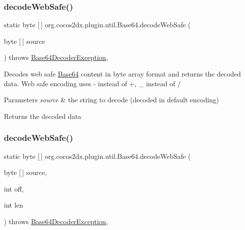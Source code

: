 \subsubsection{\texorpdfstring{decode\+Web\+Safe()}{decodeWebSafe()}\hspace{0.1cm}{\footnotesize\ttfamily [2/3]}}
{\footnotesize\ttfamily static byte \mbox{[}$\,$\mbox{]} org.\+cocos2dx.\+plugin.\+util.\+Base64.\+decode\+Web\+Safe (\begin{DoxyParamCaption}\item[{byte \mbox{[}$\,$\mbox{]}}]{source }\end{DoxyParamCaption}) throws \hyperlink{classorg_1_1cocos2dx_1_1plugin_1_1util_1_1Base64DecoderException}{Base64\+Decoder\+Exception}\hspace{0.3cm}{\ttfamily [inline]}, {\ttfamily [static]}}

Decodes web safe \hyperlink{classorg_1_1cocos2dx_1_1plugin_1_1util_1_1Base64}{Base64} content in byte array format and returns the decoded data. Web safe encoding uses \textquotesingle{}-\/\textquotesingle{} instead of \textquotesingle{}+\textquotesingle{}, \textquotesingle{}\+\_\+\textquotesingle{} instead of \textquotesingle{}/\textquotesingle{}


\begin{DoxyParams}{Parameters}
{\em source} & the string to decode (decoded in default encoding) \\
\hline
\end{DoxyParams}
\begin{DoxyReturn}{Returns}
the decoded data 
\end{DoxyReturn}
\mbox{\label{classorg_1_1cocos2dx_1_1plugin_1_1util_1_1Base64_a8de5b08172c34db233e20982ff553222}} 
\subsubsection{\texorpdfstring{decode\+Web\+Safe()}{decodeWebSafe()}\hspace{0.1cm}{\footnotesize\ttfamily [3/3]}}
{\footnotesize\ttfamily static byte \mbox{[}$\,$\mbox{]} org.\+cocos2dx.\+plugin.\+util.\+Base64.\+decode\+Web\+Safe (\begin{DoxyParamCaption}\item[{byte \mbox{[}$\,$\mbox{]}}]{source,  }\item[{int}]{off,  }\item[{int}]{len }\end{DoxyParamCaption}) throws \hyperlink{classorg_1_1cocos2dx_1_1plugin_1_1util_1_1Base64DecoderException}{Base64\+Decoder\+Exception}\hspace{0.3cm}{\ttfamily [inline]}, {\ttfamily [static]}}

